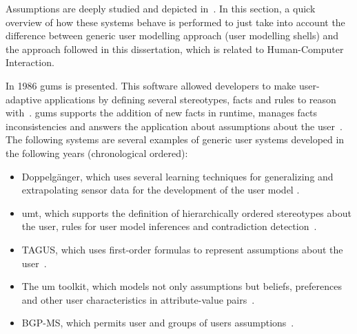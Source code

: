 % 

Assumptions are deeply studied and depicted in~\citep{pohl_logic_based_1999}. 
In this section, a quick overview of how these systems behave is performed to 
just take into account the difference between generic user modelling approach 
(user modelling shells) and the approach followed in this dissertation, which 
is related to Human-Computer Interaction.

In 1986 \ac{gums} is presented. This software allowed developers to make 
user-adaptive applications by defining several stereotypes, facts and rules to 
reason with~\citep{finin_gums_1986}. \acs{gums} supports the addition of new 
facts in runtime, manages facts inconsistencies and answers the application 
about assumptions about the user~\citep{kobsa_generic_2001}. The following 
systems are several examples of generic user systems developed in the following 
years (chronological ordered):

\begin{itemize}
  \item Doppelgänger, which uses several learning techniques for generalizing
  and extrapolating sensor data for the development of the user model
  \citep{orwant_doppelgangeruser_1991}.
  \item \ac{umt}, which supports the definition of hierarchically ordered 
  stereotypes about the user, rules for user model inferences and contradiction 
  detection~\citep{brajnik1994shell}.
  \item TAGUS, which uses first-order formulas to represent assumptions about
  the user~\citep{paiva1994tagus}.
  \item The um toolkit, which models not only assumptions but beliefs, preferences and other
  user characteristics in attribute-value pairs~\citep{kay1994toolkit}.
  \item BGP-MS, which permits user and groups of users assumptions~\citep{kobsa1994user}.
\end{itemize}

